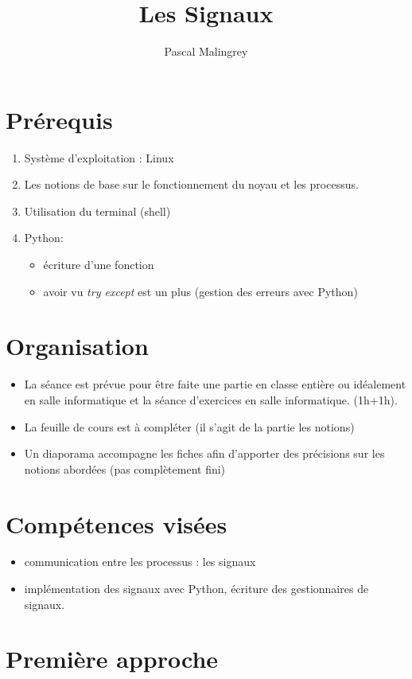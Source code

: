 \documentclass[10pt,french,A4]{article}
\title{Les Signaux}
\author{Pascal Malingrey}
\date{}
\theoremstyle{plain}
\begin{document}

  \ifProf
\section*{Prérequis}
\begin{enumerate}
    \item Système d'exploitation : Linux
    \item Les notions de base sur le fonctionnement du noyau et les processus.
    \item Utilisation du  terminal (shell)
    \item Python: 
    \begin{itemize}
        \item écriture d'une fonction
        \item avoir vu \textit{try except} est un plus (gestion des erreurs avec Python)
    \end{itemize}
\end{enumerate}
\section*{Organisation}
\begin{itemize}
\item La séance est prévue pour être faite une partie en classe entière ou idéalement en salle informatique et la séance d'exercices en salle informatique. (1h+1h). 
\item La  feuille de cours est à compléter (il s'agit de la partie les notions)
\item Un diaporama accompagne les fiches afin d'apporter des précisions sur les notions abordées (pas complètement fini)
\end{itemize}
\section*{Compétences visées}
\begin{itemize}
    \item communication entre les processus : les signaux
    \item implémentation des signaux avec Python, écriture des gestionnaires de signaux.
\end{itemize}

\tableofcontents

\newpage
\fi

\section{Première approche}
\end{document}
